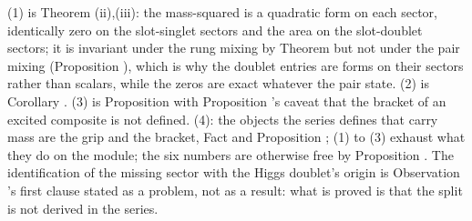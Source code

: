 (1) is Theorem (ii),(iii): the mass-squared is a quadratic form on each sector, identically zero on the slot-singlet sectors and the area on the slot-doublet sectors; it is invariant under the rung mixing by Theorem  but not under the pair mixing (Proposition ), which is why the doublet entries are forms on their sectors rather than scalars, while the zeros are exact whatever the pair state. (2) is Corollary . (3) is Proposition  with Proposition 's caveat that the bracket of an excited composite is not defined. (4): the objects the series defines that carry mass are the grip and the bracket, Fact  and Proposition ; (1) to (3) exhaust what they do on the module; the six numbers are otherwise free by Proposition . The identification of the missing sector with the Higgs doublet's origin is Observation 's first clause stated as a problem, not as a result: what is proved is that the split is not derived in the series.
